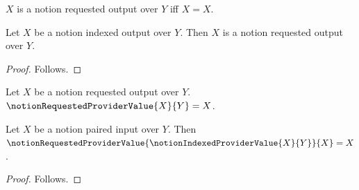 

\begin{definition}\label{notion_provider_requested_output}
    $X$ is a notion requested output over $Y$ iff $X=X$.
\end{definition}

\begin{classification}\label{notion_indexed_output_is_requested_output}
    Let $X$ be a notion indexed output over $Y$.
    Then $X$ is a notion requested output over $Y$.
\end{classification}
\begin{proof}
    Follows.
\end{proof}

\begin{definition}\label{notion_requested_provider_value}
    Let $X$ be a notion requested output over $Y$.
    $\notionRequestedProviderValue{X}{Y}=X$.
\end{definition}

\begin{proposition}\label{notion_provider_exact_result_closure_missing}
    Let $X$ be a notion paired input over $Y$.
    Then $\notionRequestedProviderValue
        {\notionIndexedProviderValue{X}{Y}}
        {X}=X$.
\end{proposition}
\begin{proof}
    Follows.
\end{proof}
